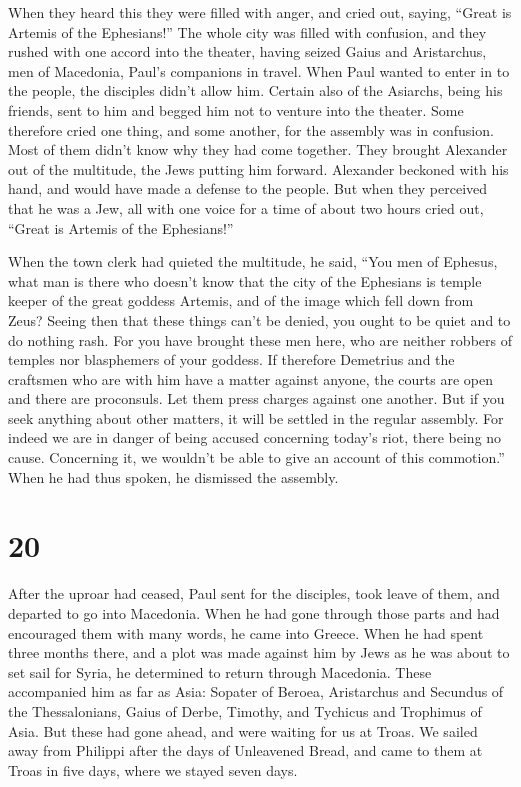  When they heard this they were filled with anger, and
cried out, saying, ``Great is Artemis of the Ephesians!'' 
The whole city was filled with confusion, and they rushed with one
accord into the theater, having seized Gaius and Aristarchus, men of
Macedonia, Paul's companions in travel.  When Paul wanted
to enter in to the people, the disciples didn't allow him. 
Certain also of the Asiarchs, being his friends, sent to him and begged
him not to venture into the theater.  Some therefore cried
one thing, and some another, for the assembly was in confusion. Most of
them didn't know why they had come together.  They brought
Alexander out of the multitude, the Jews putting him forward. Alexander
beckoned with his hand, and would have made a defense to the people.
 But when they perceived that he was a Jew, all with one
voice for a time of about two hours cried out, ``Great is Artemis of the
Ephesians!''

 When the town clerk had quieted the multitude, he said,
``You men of Ephesus, what man is there who doesn't know that the city
of the Ephesians is temple keeper of the great goddess Artemis, and of
the image which fell down from Zeus?  Seeing then that
these things can't be denied, you ought to be quiet and to do nothing
rash.  For you have brought these men here, who are neither
robbers of temples nor blasphemers of your goddess.  If
therefore Demetrius and the craftsmen who are with him have a matter
against anyone, the courts are open and there are proconsuls. Let them
press charges against one another.  But if you seek
anything about other matters, it will be settled in the regular
assembly.  For indeed we are in danger of being accused
concerning today's riot, there being no cause. Concerning it, we
wouldn't be able to give an account of this commotion.'' 
When he had thus spoken, he dismissed the assembly.

\hypertarget{section-19}{%
\section{20}\label{section-19}}

 After the uproar had ceased, Paul sent for the disciples,
took leave of them, and departed to go into Macedonia.  When
he had gone through those parts and had encouraged them with many words,
he came into Greece.  When he had spent three months there,
and a plot was made against him by Jews as he was about to set sail for
Syria, he determined to return through Macedonia.  These
accompanied him as far as Asia: Sopater of Beroea, Aristarchus and
Secundus of the Thessalonians, Gaius of Derbe, Timothy, and Tychicus and
Trophimus of Asia.  But these had gone ahead, and were
waiting for us at Troas.  We sailed away from Philippi after
the days of Unleavened Bread, and came to them at Troas in five days,
where we stayed seven days.

